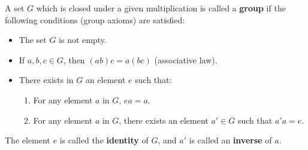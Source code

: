 A set $G$ which is closed under a given multiplication is called a \textbf{group} if the following conditions (group axioms) are satisfied:

\begin{itemize}
\item[G$_1$.] The set $G$ is not empty.
\item[G$_2$.] If $a, b, c \in G$, then $(ab)c = a(bc)$ (associative law).
\item[G$_3$.] There exists in $G$ an element $e$ such that:
  \begin{enumerate}
  \item[(1)] For any element $a$ in $G$, $ea = a$.
  \item[(2)] For any element $a$ in $G$, there exists an element $a' \in G$ such that $a'a = e$.
  \end{enumerate}
\end{itemize}

The element $e$ is called the \textbf{identity} of $G$, and $a'$ is called an \textbf{inverse} of $a$.
